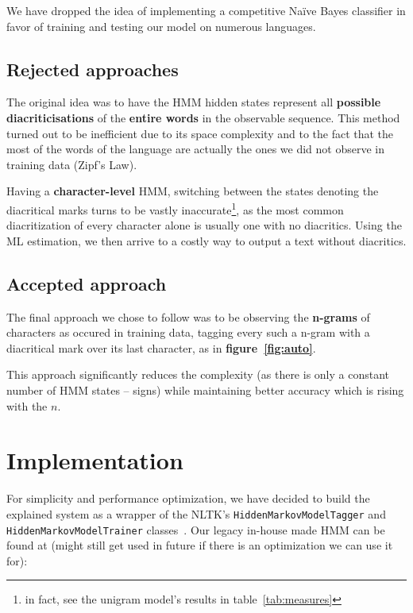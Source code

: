 \documentclass[12pt]{article}
\begin{document}
    We have dropped the idea of implementing a competitive Na\"{i}ve Bayes classifier in favor
    of training and testing our model on numerous languages.

    \subsection{Rejected approaches}\label{subsec:rejected-approaches}
    The original idea was to have the HMM hidden states represent all \textbf{possible diacriticisations} of
    the \textbf{entire words} in the observable sequence.
    This method turned out to be inefficient due to its space complexity and to the fact that the most of the
    words of the language are actually the ones we did not observe in training data (Zipf's Law).

    Having a \textbf{character-level} HMM, switching between the states denoting the diacritical marks turns to be
    vastly inaccurate\footnote{in fact, see the unigram model's results in table~\ref{tab:measures}}, as
    the most common diacritization of every character alone is usually one with no diacritics.
    Using the ML estimation, we then arrive to a costly way to output a text without diacritics.

    \subsection{Accepted approach}\label{subsec:accepted-approach}
    The final approach we chose to follow was to be observing the \textbf{n-grams} of characters as occured
    in training data, tagging every such a n-gram with a diacritical mark over its last character, as in \textbf{figure~\ref{fig:auto}}.

    This approach significantly reduces the complexity (as there is only a constant number of HMM states -- signs)
    while maintaining better accuracy which is rising with the $n$.



    \section{Implementation}\label{sec:implementation}
    For simplicity and performance optimization, we have decided to build the explained system as a wrapper
    of the \textsf{NLTK}'s \texttt{HiddenMarkovModelTagger} and \texttt{HiddenMarkovModelTrainer} classes~\cite{nltk}.
    Our legacy in-house made HMM can be found at (might still get used in future if there is an optimization we can
    use it for):
\end{document}

